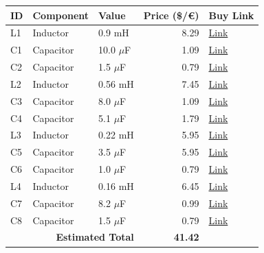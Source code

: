 \begin{table}[H]
    \centering
    \renewcommand{\arraystretch}{1.5}
    \begin{tabular}{@{}lllrl@{}}
        \toprule
        \textbf{ID} & \textbf{Component} & \textbf{Value} & \textbf{Price (\$/€)} & \textbf{Buy Link} \\
        \midrule
        L1 & Inductor & 0.9 mH & 8.29 & \href{https://www.parts-express.com/Dayton-Audio-LW18-90-0.90mH-18-AWG-Perfect-Layer-Inductor-257-824}{Link} \\
        C1 & Capacitor & 10.0 $\mu$F & 1.09 & \href{https://www.parts-express.com/10uF-100V-Non-Polarized-Capacitor-027-340}{Link} \\
        C2 & Capacitor & 1.5 $\mu$F & 0.79 & \href{https://www.parts-express.com/Solen-1.5uF-400V-Polypropylene-Capacitor-027-528}{Link} \\
        L2 & Inductor & 0.56 mH & 7.45 & \href{https://www.soundimports.eu/en/jantzen-audio-000-2377.html}{Link} \\
        C3 & Capacitor & 8.0 $\mu$F & 1.09 & \href{https://www.parts-express.com/8.0uF-100V-Non-Polarized-Capacitor-027-338}{Link} \\
        C4 & Capacitor & 5.1 $\mu$F & 1.79 & \href{https://www.parts-express.com/Solen-5.1uF-400V-Polypropylene-Capacitor-027-554}{Link} \\
        L3 & Inductor & 0.22 mH & 5.95 & \href{https://www.soundimports.eu/en/dayton-audio-lw18-22.html}{Link} \\
        C5 & Capacitor & 3.5 $\mu$F & 5.95 & \href{https://www.soundimports.eu/en/audyn-q6-3-5-600.html}{Link} \\
        C6 & Capacitor & 1.0 $\mu$F & 0.79 & \href{https://www.parts-express.com/Dayton-Audio-PMPC-1.0-1.0uF-250V-Precision-Audio-Capacitor-027-210}{Link} \\
        L4 & Inductor & 0.16 mH & 6.45 & \href{https://www.soundimports.eu/en/jantzen-audio-000-1627.html}{Link} \\
        C7 & Capacitor & 8.2 $\mu$F & 0.99 & \href{https://www.soundimports.eu/en/it-intertechnik-elcr-8-2-100.html}{Link} \\
        C8 & Capacitor & 1.5 $\mu$F & 0.79 & \href{https://www.parts-express.com/Solen-1.5uF-400V-Polypropylene-Capacitor-027-528}{Link} \\
        \midrule
        \multicolumn{3}{r}{\textbf{Estimated Total}} & \textbf{41.42} & \\
        \bottomrule
    \end{tabular}
\end{table}
